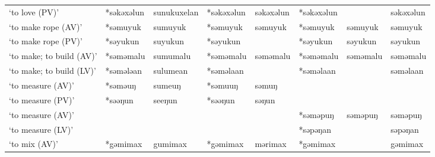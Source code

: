 \begin{landscape}
\begin{longtable}[c]{@{}p{3cm}<{\raggedright}p{2.75cm}<{\raggedright}p{2.75cm}<{\raggedright}p{2.75cm}<{\raggedright}p{2.75cm}<{\raggedright}p{2.75cm}<{\raggedright}p{2.75cm}<{\raggedright}p{2.75cm}<{\raggedright}@{}}
`to love (PV)'                                       & *səkəxəlun         & sunukuxelan                    & *səkəxəlun         & səkəxəlun                  & *səkəxəlun       &                          & səkəxəlun                         \\
`to make rope (AV)'                                  & *səmuyuk           & sumuyuk                        & *səmuyuk           & səmuyuk                    & *səmuyuk         & səmuyuk                  & səmuyuk                           \\
`to make rope (PV)'                                  & *səyukun           & suyukun                        & *səyukun           &                            & *səyukun         & səyukun                  & səyukun                           \\
`to make; to build (AV)'                             & *səməmalu          & sumumalu                       & *səməmalu          & səməmalu                   & *səməmalu        & səməmalu                 & səməmalu                          \\
`to make; to build (LV)'                             & *səmələan          & sulumean                       & *səməlaan          &                            & *səməlaan        &                          & səməlaan                          \\
`to measure (AV)'                                    & *səməuŋ            & sumeuŋ                         & *səmuuŋ            & səmuŋ                      &                  &                          &                                   \\
`to measure (PV)'                                    & *səəŋun            & seeŋun                         & *səəŋun            & səŋun                      &                  &                          &                                   \\
`to measure (AV)'                                    &                    &                                &                    &                            & *səməpuŋ         & səməpuŋ                  & səməpuŋ                           \\
`to measure (LV)'                                    &                    &                                &                    &                            & *səpəŋan         &                          & səpəŋan                           \\
`to mix (AV)'                                        & *gəmimax           & gumimax                        & *gəmimax           & mərimax                    & *gəmimax         &                          & gəmimax                           \\

\end{longtable}
\end{landscape}
